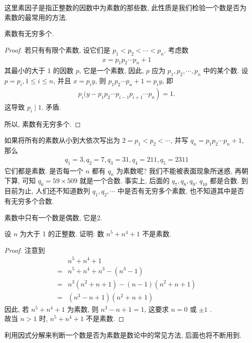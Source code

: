 \begin{note}
	这里素因子是指正整数的因数中为素数的那些数, 此性质是我们检验一个数是否为素数的最常用的方法.
\end{note}

\begin{property}\label{prop:素数有无穷多个}
	素数有无穷多个.
\end{property}
\begin{proof}
	若只有有限个素数, 设它们是 $p_{1}<p_{2}<\cdots<p_{n}$. 考虑数
	\begin{align*}
		x=p_{1} p_{2} \cdots p_{n}+1
	\end{align*}
	其最小的大于 1 的因数 $p$, 它是一个素数, 因此, $p$ 应为 $p_{1}, p_{2}, \cdots, p_{n}$ 中的某个数. 设 $p=p_{i}, 1 \leqslant i \leqslant n$, 并且 $x=p_{i} y$, 则 $p_{1} p_{2} \cdots p_{n}+1=p_{i} y$, 即
	\begin{align*}
		p_{i}(y-\left.p_{1} p_{2} \cdots p_{i-1} p_{i+1} \cdots p_{n}\right)=1.
	\end{align*}
	这导致 $p_{i} \mid 1$. 矛盾.

	所以, 素数有无穷多个.
\end{proof}
\begin{note}
	如果将所有的素数从小到大依次写出为 $2=p_{1}<p_{2}<\cdots$, 并写 $q_{n}=p_{1} p_{2} \cdots p_{n}+1$, 那么
	\begin{align*}
		q_{1}=3, q_{2}=7, q_{3}=31, q_{4}=211, q_{5}=2311
	\end{align*}
	它们都是素数. 是否每一个 $n$ 都有 $q_{n}$ 为素数呢? 我们不能被表面现象所迷惑, 再朝下算, 可知 $q_{6}=59 \times 509$ 就是一个合数. 事实上, 后面的 $q_{7}, q_{8}, q_{9}$, $q_{10}$ 都是合数. 到目前为止, 人们还不知道数列 $q_{1}, q_{2}, \cdots$ 中是否有无穷多个素数, 也不知道其中是否有无穷多个合数.
\end{note}

\begin{property}
	素数中只有一个数是偶数, 它是2.
\end{property}

\begin{example}
	设 $n$ 为大于 1 的正整数. 证明: 数 $n^{5}+n^{4}+1$ 不是素数.
\end{example}
\begin{proof}
	注意到
	\begin{align}
		  & n^{5}+n^{4}+1                                           \\
		= & n^{5}+n^{4}+n^{3}-\left(n^{3}-1\right)                  \\
		= & n^{3}\left(n^{2}+n+1\right)-(n-1)\left(n^{2}+n+1\right) \\
		= & \left(n^{3}-n+1\right)\left(n^{2}+n+1\right)
	\end{align}
	因此, 若 $n^{5}+n^{4}+1$ 为素数, 则 $n^{3}-n+1=1$, 这要求 $n=0$ 或 $\pm 1$ . \\
	故当 $n>1$ 时,  $n^{5}+n^{4}+1$ 不是素数.
\end{proof}
\begin{note}
	利用因式分解来判断一个数是否为素数是数论中的常见方法, 后面也将不断用到.
\end{note}

